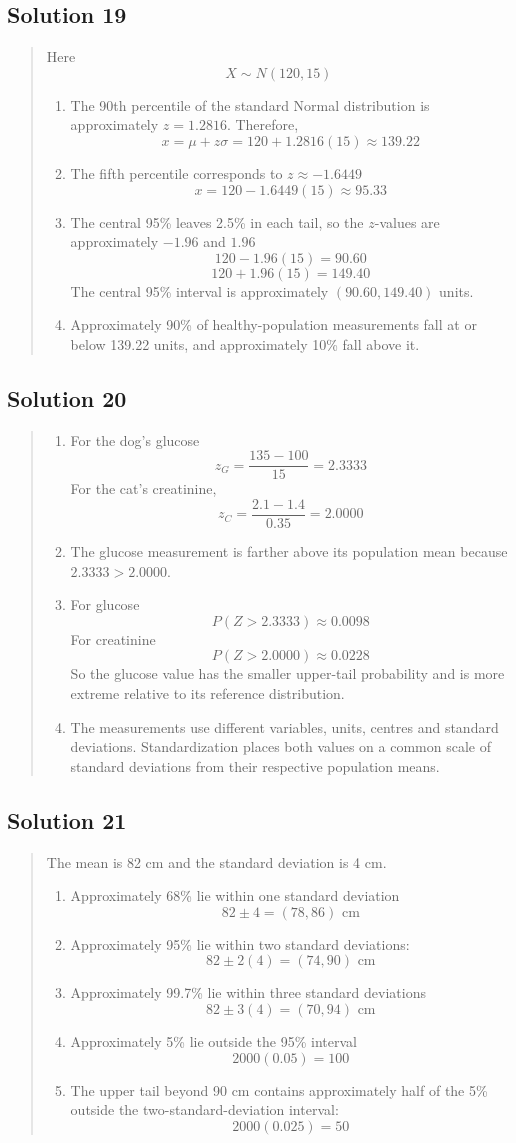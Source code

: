 \documentclass[10pt,letterpaper]{article}
\newcommand{\solutionheading}[1]{%
  \subsection*{Solution #1}
}
\newenvironment{answer}{%
  \begin{quote}\small\color{black}
}{%
  \end{quote}
}
\begin{document}
\solutionheading{19}
\begin{answer}
Here
$$X\sim N(120,15)$$

\begin{enumerate}
	\item The 90th percentile of the standard Normal distribution is approximately $z=1.2816$. Therefore,
  	$$x=\mu+z\sigma=120+1.2816(15)\approx139.22$$
  	\item The fifth percentile corresponds to $z\approx-1.6449$
	$$x=120-1.6449(15)\approx95.33$$
	\item The central 95\% leaves 2.5\% in each tail, so the $z$-values are approximately $-1.96$ and $1.96$
	$$120-1.96(15)=90.60$$
	$$120+1.96(15)=149.40$$
  	The central 95\% interval is approximately $(90.60,149.40)$ units.
 	 \item Approximately 90\% of healthy-population measurements fall at or below 139.22 units, and approximately 10\% fall above it.
\end{enumerate}
\end{answer}

\solutionheading{20}
\begin{answer}
\begin{enumerate}
	\item For the dog's glucose
	$$z_G=\frac{135-100}{15}=2.3333$$
	For the cat's creatinine,
	$$z_C=\frac{2.1-1.4}{0.35}=2.0000$$
	\item The glucose measurement is farther above its population mean because $2.3333>2.0000$.
	\item For glucose
	$$P(Z>2.3333)\approx0.0098$$
	For creatinine
	$$P(Z>2.0000)\approx0.0228$$
	So the glucose value has the smaller upper-tail probability and is more extreme relative to its reference distribution.
	\item The measurements use different variables, units, centres and standard deviations. Standardization places both values on a common scale of standard deviations from their respective population means.
\end{enumerate}
\end{answer}

\solutionheading{21}
\begin{answer}
The mean is 82 cm and the standard deviation is 4 cm.
\begin{enumerate}
	\item Approximately 68\% lie within one standard deviation
 	$$82\pm4=(78,86)\text{ cm}$$
	\item Approximately 95\% lie within two standard deviations:
	$$82\pm2(4)=(74,90)\text{ cm}$$
	\item Approximately 99.7\% lie within three standard deviations
	$$82\pm3(4)=(70,94)\text{ cm}$$
	\item Approximately 5\% lie outside the 95\% interval
	$$2000(0.05)=100$$
	\item The upper tail beyond 90 cm contains approximately half of the 5\% outside the two-standard-deviation interval:
	$$2000(0.025)=50$$
\end{enumerate}
\end{answer}
\end{document}
